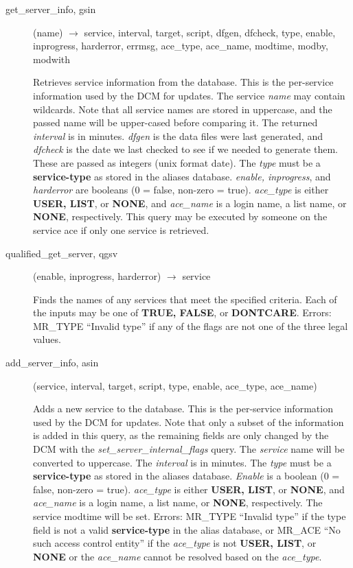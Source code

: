\begin{description}

\item[get\_server\_info, gsin](name) $\rightarrow$ service, interval, target,
script, dfgen, dfcheck, type, enable, inprogress, harderror, errmsg,
ace\_type, ace\_name, modtime, modby, modwith

Retrieves service information from the database.  This is the
per-service information used by the DCM for updates.  The service
{\em name} may contain wildcards.  Note that all service names are
stored in uppercase, and the passed name will be upper-cased before
comparing it.  The returned {\em interval} is in minutes.  {\em dfgen} is
the data files were last generated, and {\em dfcheck} is the date we
last checked to see if we needed to generate them.  These are passed
as integers (unix format date).  The {\em type} must be a
{\bf service-type} as stored in the aliases database.  {\em enable,
inprogress}, and {\em harderror} are booleans (0 = false, non-zero =
true).  {\em ace\_type} is either {\bf USER, LIST}, or {\bf NONE}, and
{\em ace\_name} is a login name, a list name, or {\bf NONE}, respectively.
This query may be executed by someone on the service ace if only one
service is retrieved.

\item[qualified\_get\_server, qgsv](enable, inprogress, harderror)
$\rightarrow$ service

Finds the names of any services that meet the specified criteria.
Each of the inputs may be one of {\bf TRUE, FALSE}, or {\bf DONTCARE}.
Errors: MR\_TYPE ``Invalid type'' if any of the flags are not one of the
three legal values.

\item[add\_server\_info, asin](service, interval, target, script, type, enable,
ace\_type, ace\_name)

Adds a new service to the database.  This is the per-service
information used by the DCM for updates.  Note that only a subset of
the information is added in this query, as the remaining fields are
only changed by the DCM with the {\em set\_server\_internal\_flags} query.
The {\em service} name will be converted to uppercase.  The {\em interval}
is in minutes.  The {\em type} must be a {\bf service-type} as stored in
the aliases database.  {\em Enable} is a boolean (0 = false, non-zero =
true).  {\em ace\_type} is either {\bf USER, LIST}, or {\bf NONE}, and
{\em ace\_name} is a login name, a list name, or {\bf NONE}, respectively.
The service modtime will be set.  Errors: MR\_TYPE ``Invalid type'' if
the type field is not a valid {\bf service-type} in the alias database,
or MR\_ACE ``No such access control entity'' if the {\em ace\_type} is not
{\bf USER, LIST}, or {\bf NONE} or the {\em ace\_name} cannot be resolved
based on the {\em ace\_type}.


\end{description}
